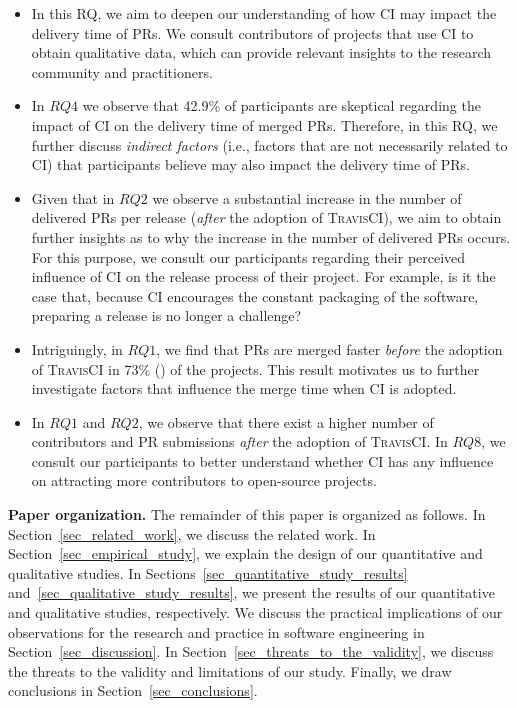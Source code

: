 \begin{itemize}
    \item \textit{\textbf{\RQfive}}
    In this RQ, we aim to deepen our understanding of how CI may impact the delivery time of PRs. We consult contributors of projects that use CI to obtain qualitative data, which can provide relevant insights to the research community and practitioners. 
    
    \item \textit{\textbf{\RQfour}} 		
    In $RQ4$ we observe that 42.9\% of participants are skeptical regarding the impact of CI on the delivery time of merged PRs. Therefore, in this RQ, we further discuss {\em indirect factors} (i.e., factors that are not necessarily related to CI) that participants believe may also impact the delivery time of PRs.

    \item \textit{\textbf{\RQsix}}
    Given that in $RQ2$ we observe a substantial increase in the number of delivered PRs per release (\textit{after} the adoption of \textsc{TravisCI}), 
    we aim to obtain further insights as to why the increase in the number of delivered PRs occurs. For this purpose, we consult our participants regarding their perceived influence of CI on the release process of their project. For example, is it the case that, because CI encourages the constant packaging of the software, preparing a release is no longer a challenge?	
    
    \item \textit{\textbf{\RQseven}} 
    Intriguingly, in $RQ1$, we find that PRs are merged faster \textit{before} the adoption of \textsc{TravisCI} in 73\% () of the projects. This result motivates us to further investigate factors that influence the merge time when CI is adopted. 
    
    \item \textit{\textbf{\RQeight}}
    In $RQ1$ and $RQ2$, we observe that there exist a higher number of contributors and PR submissions \textit{after} the adoption of \textsc{TravisCI}. In $RQ8$, we consult our participants to better understand whether CI has any influence on attracting more contributors to open-source projects.	
    
\end{itemize}
	
\textbf{Paper organization.}
The remainder of this paper is
organized as follows. 
In Section~\ref{sec_related_work}, we discuss the related work.
In Section~\ref{sec_empirical_study}, we explain the design of our quantitative and qualitative studies.
In Sections~\ref{sec_quantitative_study_results} and~\ref{sec_qualitative_study_results}, we present the results of our quantitative and qualitative studies, respectively. 
We discuss the practical implications of our observations for the research and practice in software engineering in Section~\ref{sec_discussion}. 
In Section~\ref{sec_threats_to_the_validity}, we discuss the threats to the validity and limitations of our study.
Finally, we draw conclusions in Section~\ref{sec_conclusions}. 

